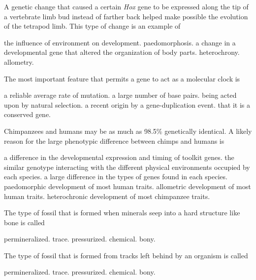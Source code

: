 \question
A genetic change that caused a certain \textit{Hox} gene to be expressed along the tip of a vertebrate limb bud instead of farther back helped make possible the  evolution of the tetrapod limb. This type of change is an example of 
\begin{choices}
\choice the influence of environment on development.%
\choice paedomorphosis.%
\correctchoice a change in a developmental gene that altered the organization of body parts.%
\choice heterochrony.%
\choice allometry.%
\end{choices}

\question
The most important feature that permits a gene to act as a molecular clock is 

\begin{choices}
\correctchoice a reliable average rate of mutation. %
\choice a large number of base pairs. %
\choice being acted upon by natural selection. %
\choice a recent origin by a gene-duplication event. %
\choice that it is a conserved gene. %
\end{choices}

\question
Chimpanzees and humans may be as much as 98.5\% genetically identical.  A likely reason for the large phenotypic difference between chimps and humans is

\begin{choices}
\correctchoice a difference in the developmental expression and timing of toolkit genes. %
\choice the similar genotype interacting with the different physical environments occupied by each species. %
\choice a large difference in the types of genes found in each species. %
\choice paedomorphic development of most human traits. %
\choice allometric development of most human traits. %
\choice heterochronic development of most chimpanzee traits. %
\end{choices}

\question
The type of fossil that is formed when minerals seep into a hard structure like bone is called

\begin{choices}
\correctchoice permineralized. %
\choice trace. %
\choice pressurized. %
\choice chemical. %
\choice bony. %
\end{choices}

\question
The type of fossil that is formed from tracks left behind by an organism is called

\begin{choices}
	\choice permineralized. %
	\correctchoice trace. %
	\choice pressurized. %
	\choice chemical. %
	\choice bony. %
\end{choices}
